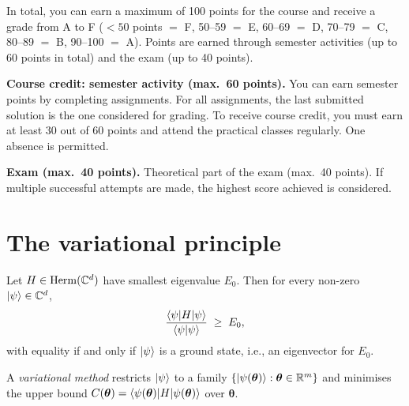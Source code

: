 \documentclass[handoutsbeamer.tex]{subfiles}
\begin{document}
\begin{frame}
In total, you can earn a maximum of 100 points for the course and receive a grade from A to F ($<50$ points $=$ F, 50--59 $=$ E, 60--69 $=$ D, 70--79 $=$ C, 80--89 $=$ B, 90--100 $=$ A).
Points are earned through semester activities (up to 60 points in total) and the exam (up to 40 points).

\textbf{Course credit: semester activity (max.\ 60 points).}
You can earn semester points by completing assignments.
For all assignments, the last submitted solution is the one considered for grading.
To receive course credit, you must earn at least 30 out of 60 points and attend the practical classes regularly. One absence is permitted.

\textbf{Exam (max.\ 40 points).}
Theoretical part of the exam (max.\ 40 points). If multiple successful attempts are made, the highest score achieved is considered.
\end{frame}

\section{The variational principle}


\begin{frame}
\begin{thm}\label{thm:ch01:variational}
Let $H \in \mathrm{Herm}(\mathbb{C}^{d})$ have smallest eigenvalue $E_0$. Then for every non-zero $\ket{\psi} \in \mathbb{C}^d$,
\begin{equation}
    \frac{\braket{\psi|H|\psi}}{\braket{\psi|\psi}} \;\geq\; E_0,
\end{equation}
with equality if and only if $\ket{\psi}$ is a ground state, i.e., an eigenvector for $E_0$.
\end{thm}
A \emph{variational method} restricts $\ket{\psi}$ to a family $\{\ket{\psi(\boldsymbol\theta)} : \boldsymbol\theta \in \mathbb{R}^m\}$ and minimises the upper bound $C(\boldsymbol\theta) = \braket{\psi(\boldsymbol\theta)|H|\psi(\boldsymbol\theta)}$ over $\boldsymbol\theta$.
\end{frame}
\end{document}
